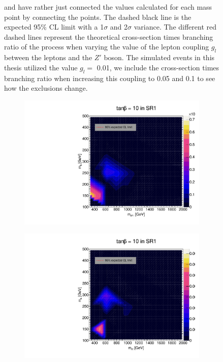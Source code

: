 \documentclass[12pt, a4paper]{book}
\begin{document}
\begin{figure}[!ht]
{   and have rather just connected the values calculated for each mass point by connecting the points. The dashed black line is the expected 95\% CL limit with a 1$\sigma$ and 2$\sigma$ variance. 
   The different red dashed lines represent the theoretical cross-section times branching ratio of the process when varying the value of the lepton coupling $g_l$ between the leptons and the $Z'$ boson. The simulated events in this thesis utilized the value $g_l=$ 0.01, we include the cross-section times branching ratio when increasing this coupling to 0.05 and 0.1 to see how the exclusions change.  }
\end{figure}

\begin{figure}[!ht]
	\centering
	\begin{subfigure}[b]{0.49\textwidth}
      \centering
      \includegraphics[width=1\textwidth]{Limits/Model_independent/50-100/2HDM/2HDM_ee_tb10.pdf}
   \end{subfigure}
   \hfill
   \begin{subfigure}[b]{0.49\textwidth}
      \centering
      \includegraphics[width=1\textwidth]{Limits/Model_independent/50-100/2HDM/2HDM_uu_tb10.pdf}

\end{subfigure}
\end{figure}
\end{document}

